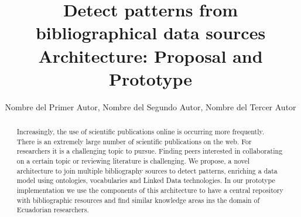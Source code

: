 \documentclass[11pt]{article}
\title{Detect patterns from bibliographical data sources Architecture: Proposal and Prototype}
\author{Nombre del Primer Autor\inst{1}, Nombre del Segundo Autor\inst{2}, Nombre del Tercer Autor\inst{1,3} }
\begin{document}
 


\renewcommand{\refname}{References}
\renewcommand{\tablename}{Table}
\renewcommand{\figurename}{Figure}

\maketitle

\begin{abstract}

%
Increasingly, the use of scientific publications online is occurring more frequently. There is an extremely large number of scientific publications on the web. For researchers it is a challenging topic to pursue. Finding peers interested in collaborating on a certain topic or reviewing literature is challenging. We propose, a novel architecture to join multiple bibliography sources to detect patterns, %
enriching a data model using ontologies, vocabularies and Linked Data technologies. In our prototype implementation we use  the components of this architecture to have a central repository with bibliographic resources and find similar knowledge areas ins the domain of Ecuadorian researchers. 

\end{abstract}
\end{document}
